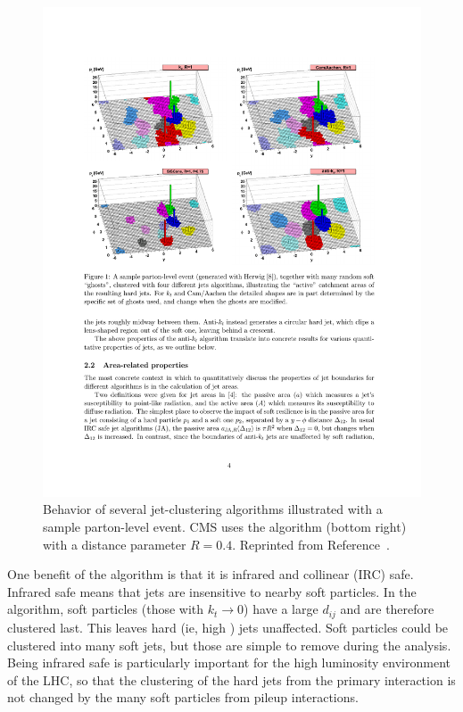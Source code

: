  \begin{figure}[h!]
	\centering
	\includegraphics[width=\linewidth]{Figures/EventReconstruction/jetAlgorithms.pdf}
       \caption[Behavior of several jet-clustering algorithms illustrated with a sample parton-level event.]
       {Behavior of several jet-clustering algorithms illustrated with a sample parton-level event. 
       CMS uses the \antikt algorithm (bottom right) with a distance parameter $R = 0.4$.
       Reprinted from Reference~\cite{antikt}.}
       \label{fig:jetAlgorithms}
\end{figure}
 
One benefit of the \antikt algorithm is that it is infrared and collinear (IRC) safe. Infrared safe means that \antikt jets are insensitive to nearby soft particles. In the \antikt algorithm, soft particles (those with $k_t \rightarrow 0$) have a large $d_{ij}$ and are therefore clustered last. This leaves hard (ie, high \pT) jets unaffected. Soft particles could be clustered into many soft jets, but those are simple to remove during the analysis. Being infrared safe is particularly important for the high luminosity environment of the LHC, so that the clustering of the hard jets from the primary interaction is not changed by the many soft particles from pileup interactions.

